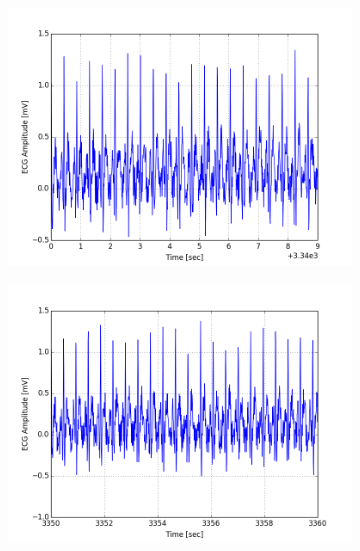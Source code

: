 \documentclass[paper=a4, fontsize=11pt]{scrartcl}
\numberwithin{equation}{section}		%
\numberwithin{figure}{section}			%
\numberwithin{table}{section}		    %
\begin{document}
\begin{appendices}
\begin{figure}[H]
	\centering
	\begin{subfigure}[b]{0.3\textwidth}
		\includegraphics[width=\textwidth]{sim/ecg_70}
	\end{subfigure}
	\begin{subfigure}[b]{0.3\textwidth}
		\includegraphics[width=\textwidth]{sim/ecg_71}
	\end{subfigure}
	\begin{subfigure}[b]{0.3\textwidth}

\end{subfigure}
\end{figure}
\end{appendices}
\end{document}

